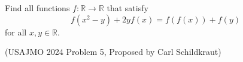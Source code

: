 Find all functions $f:\mathbb{R}\rightarrow\mathbb{R}$ that satisfy
\[
f(x^2-y)+2yf(x)=f(f(x))+f(y)
\]for all $x,y\in\mathbb{R}$.

(USAJMO 2024 Problem 5, Proposed by Carl Schildkraut)
